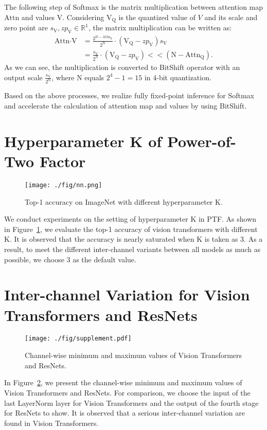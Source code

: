 \documentclass{article}
\begin{document}
The following step of Softmax is the matrix multiplication between attention map $\textrm{Attn}$ and values $\textrm{V}$. Considering $\textrm{V}_\textrm{Q}$ is the quantized value of $V$ and its scale and zero point are $s_\textrm{V},{zp}_\textrm{V}\in \mathds{R}^1$, the matrix multiplication can be written as:
\begin{align}
    \textrm{Attn}\cdot \textrm{V} &= \frac{2^{\textrm{N}-\textrm{Attn}_\textrm{Q}}}{2^\textrm{N}}\cdot (\textrm{V}_\textrm{Q}-{zp}_\textrm{V})s_\textrm{V}\\
    & = \frac{s_\textrm{V}}{2^\textrm{N}} \cdot (\textrm{V}_\textrm{Q}-{zp}_\textrm{V}) << (\textrm{N}-\textrm{Attn}_\textrm{Q}).
\end{align}
As we can see, the multiplication is converted to BitShift operator with an output scale $\frac{s_\textrm{V}}{2^\textrm{N}}$, where $\textrm{N}$ equals $2^4-1=15$ in 4-bit quantization.


Based on the above processes, we realize fully fixed-point inference for Softmax and accelerate the calculation of attention map and values by using BitShift.


\section{Hyperparameter \textrm{K} of Power-of-Two Factor}
\begin{figure}[t]
\centering
\texttt{[image: ./fig/nn.png]}
\caption{Top-1 accuracy on ImageNet with different hyperparameter K.}
\label{K}
\end{figure}

We conduct experiments on the setting of hyperparameter \textrm{K} in PTF. As shown in Figure~\ref{K}, we evaluate the top-1 accuracy of vision transformers with different \textrm{K}. It is observed that the accuracy is nearly saturated when \textrm{K} is taken as 3. As a result, to meet the different inter-channel variants between all models as much as possible, we choose 3 as the default value.

\section{Inter-channel Variation for Vision Transformers and ResNets}
\begin{figure*}[t]
    \centering
    \texttt{[image: ./fig/supplement.pdf]}
    \caption{Channel-wise minimum and maximum values of Vision Transformers and ResNets.}
    \label{channel}
\end{figure*}
In Figure~\ref{channel}, we present the channel-wise minimum and maximum values of Vision Transformers and ResNets. For comparison, we choose the input of the last LayerNorm layer for Vision Transformers and the output of the fourth stage for ResNets to show. It is observed that a serious inter-channel variation are found in Vision Transformers.
 
\end{document}

